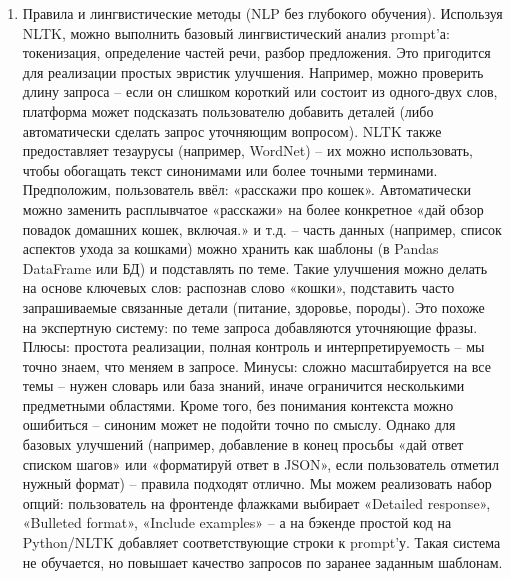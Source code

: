 \begin{enumerate}[label=\arabic*]

\item Правила и лингвистические методы (NLP без глубокого обучения). Используя NLTK, можно выполнить базовый лингвистический анализ prompt’а: токенизация, определение частей речи, разбор предложения. Это пригодится для реализации простых эвристик улучшения. Например, можно проверить длину запроса – если он слишком короткий или состоит из одного-двух слов, платформа может подсказать пользователю добавить деталей (либо автоматически сделать запрос уточняющим вопросом). NLTK также предоставляет тезаурусы (например, WordNet) – их можно использовать, чтобы обогащать текст синонимами или более точными терминами. Предположим, пользователь ввёл: «расскажи про кошек». Автоматически можно заменить расплывчатое «расскажи» на более конкретное «дай обзор повадок домашних кошек, включая.» и т.д. – часть данных (например, список аспектов ухода за кошками) можно хранить как шаблоны (в Pandas DataFrame или БД) и подставлять по теме. Такие улучшения можно делать на основе ключевых слов: распознав слово «кошки», подставить часто запрашиваемые связанные детали (питание, здоровье, породы). Это похоже на экспертную систему: по теме запроса добавляются уточняющие фразы. Плюсы: простота реализации, полная контроль и интерпретируемость – мы точно знаем, что меняем в запросе. Минусы: сложно масштабируется на все темы – нужен словарь или база знаний, иначе ограничится несколькими предметными областями. Кроме того, без понимания контекста можно ошибиться – синоним может не подойти точно по смыслу. Однако для базовых улучшений (например, добавление в конец просьбы «дай ответ списком шагов» или «форматируй ответ в JSON», если пользователь отметил нужный формат) – правила подходят отлично. Мы можем реализовать набор опций: пользователь на фронтенде флажками выбирает «Detailed response», «Bulleted format», «Include examples» – а на бэкенде простой код на Python/NLTK добавляет соответствующие строки к prompt’у. Такая система не обучается, но повышает качество запросов по заранее заданным шаблонам.


\end{enumerate}
